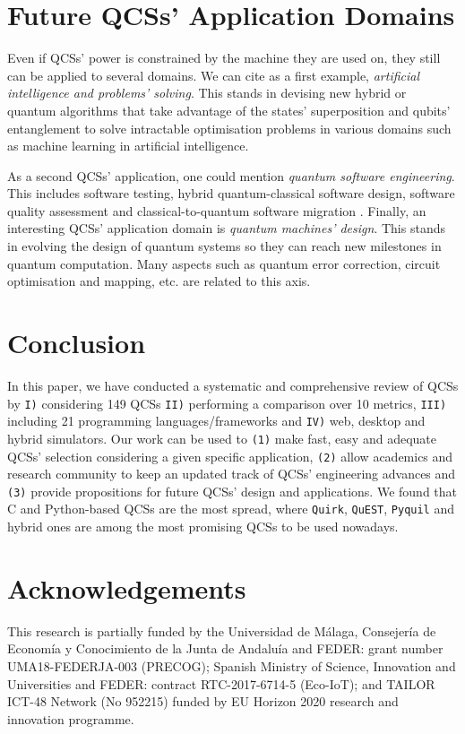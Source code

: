 \documentclass[conference]{IEEEtran}
\begin{document}
\section{Future QCSs' Application Domains \label{sec:FA}}

Even if QCSs' power is constrained by the machine they are used on, they still can be applied to several domains. We can cite as a first example, \textit{artificial intelligence and problems' solving}. This stands in devising new hybrid or quantum algorithms that take advantage of the states' superposition and qubits' entanglement to solve intractable optimisation problems in various domains such as machine learning in artificial intelligence.

As a second QCSs' application, one could mention \textit{quantum software engineering}. This includes software testing, hybrid quantum-classical software design, software quality assessment and classical-to-quantum software migration \cite{ref_8}. Finally, an interesting QCSs' application domain is \textit{quantum machines' design}. This stands in evolving the design of quantum systems so they can reach new milestones in quantum computation. Many aspects such as quantum error correction, circuit optimisation and mapping, etc. are related to this axis. 


\section{Conclusion \label{sec:conc}}
In this paper, we have conducted a systematic and comprehensive review of QCSs by \texttt{I)} considering 149 QCSs \texttt{II)} performing a comparison over 10 metrics, \texttt{III)} including 21 programming languages/frameworks and \texttt{IV)} web, desktop and hybrid simulators. Our work can be used to \texttt{(1)} make fast, easy and adequate QCSs' selection considering a given specific application, \texttt{(2)} allow academics and research community to keep an updated track of QCSs' engineering advances and \texttt{(3)} provide propositions for future QCSs' design and applications. We found that C and Python-based QCSs are the most spread, where \texttt{Quirk}, \texttt{QuEST}, \texttt{Pyquil} and hybrid ones are among the most promising QCSs to be used nowadays.   

\section*{Acknowledgements}
This research is partially funded by the Universidad de M\'alaga, Consejer\'ia de Econom\'ia y Conocimiento de la Junta de Andalu\'ia and FEDER: grant number UMA18-FEDERJA-003 (PRECOG); Spanish Ministry of Science, Innovation and Universities and FEDER: contract RTC-2017-6714-5 (Eco-IoT); and TAILOR ICT-48 Network (No 952215) funded by EU Horizon 2020 research and innovation programme. 
\end{document}
